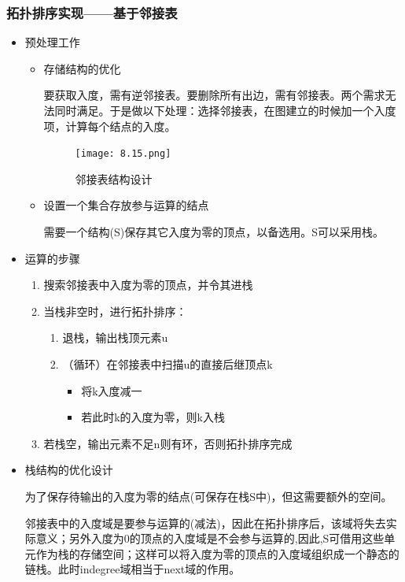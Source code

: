 \documentclass[AutoFakeBold]{LZUThesis2007}
\begin{document}
			\subsubsection{拓扑排序实现——基于邻接表}
\begin{itemize}
	\item 预处理工作
				\begin{itemize}
					\item 存储结构的优化
				
				要获取入度，需有逆邻接表。要删除所有出边，需有邻接表。两个需求无法同时满足。于是做以下处理：选择邻接表，在图建立的时候加一个入度项，计算每个结点的入度。
				\begin{figure}[H]
				    \centering
				    \texttt{[image: 8.15.png]}
				    \caption{邻接表结构设计}
				    \label{fig_install_texlive}
				\end{figure}
				
					\item 设置一个集合存放参与运算的结点
				
				需要一个结构(S)保存其它入度为零的顶点，以备选用。S可以采用栈。
				\end{itemize}
	\item 运算的步骤
		\begin{enumerate}
			\item 搜索邻接表中入度为零的顶点，并令其进栈
			\item 当栈非空时，进行拓扑排序：
				\begin{enumerate}
					\item 退栈，输出栈顶元素u
					\item （循环）在邻接表中扫描u的直接后继顶点k
						\begin{itemize}
							\item 将k入度减一
							\item 若此时k的入度为零，则k入栈
						\end{itemize}
				\end{enumerate}
			\item 若栈空，输出元素不足n则有环，否则拓扑排序完成
		\end{enumerate}
	\item 栈结构的优化设计

为了保存待输出的入度为零的结点(可保存在栈S中)，但这需要额外的空间。

邻接表中的入度域是要参与运算的(减法)，因此在拓扑排序后，该域将失去实际意义；另外入度为0的顶点的入度域是不会参与运算的,因此,S可借用这些单元作为栈的存储空间；这样可以将入度为零的顶点的入度域组织成一个静态的链栈。此时indegree域相当于next域的作用。
\end{itemize}
\end{document}
